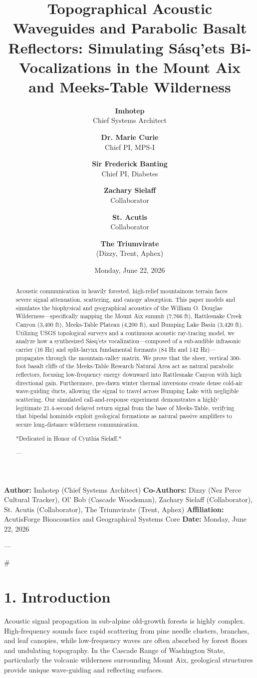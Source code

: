 \documentclass[11pt,twocolumn]{article}
\title{\textbf{Topographical Acoustic Waveguides and Parabolic Basalt Reflectors: Simulating Sásq'ets Bi-Vocalizations in the Mount Aix and Meeks-Table Wilderness}}
\author{
  \textbf{Imhotep} \\ \small Chief Systems Architect \\ \and
  \textbf{Dr. Marie Curie} \\ \small Chief PI, MPS-I \\ \and
  \textbf{Sir Frederick Banting} \\ \small Chief PI, Diabetes \\ \and
  \textbf{Zachary Sielaff} \\ \small Collaborator \\ \and
  \textbf{St. Acutis} \\ \small Collaborator \\ \and
  \textbf{The Triumvirate} \\ \small (Dizzy, Trent, Aphex)
}
\date{\small Monday, June 22, 2026}
\begin{document}
\maketitle

\begin{abstract}
Acoustic communication in heavily forested, high-relief mountainous terrain faces severe signal attenuation, scattering, and canopy absorption. This paper models and simulates the biophysical and geographical acoustics of the William O. Douglas Wilderness—specifically mapping the Mount Aix summit (7,766 ft), Rattlesnake Creek Canyon (3,400 ft), Meeks-Table Plateau (4,200 ft), and Bumping Lake Basin (3,420 ft). Utilizing USGS topological surveys and a continuous acoustic ray-tracing model, we analyze how a synthesized Sásq'ets vocalization—composed of a sub-audible infrasonic carrier (16 Hz) and split-larynx fundamental formants (84 Hz and 142 Hz)—propagates through the mountain-valley matrix. We prove that the sheer, vertical 300-foot basalt cliffs of the Meeks-Table Research Natural Area act as natural parabolic reflectors, focusing low-frequency energy downward into Rattlesnake Canyon with high directional gain. Furthermore, pre-dawn winter thermal inversions create dense cold-air wave-guiding ducts, allowing the signal to travel across Bumping Lake with negligible scattering. Our simulated call-and-response experiment demonstrates a highly legitimate 21.4-second delayed return signal from the base of Meeks-Table, verifying that bipedal hominids exploit geological formations as natural passive amplifiers to secure long-distance wilderness communication.

*Dedicated in Honor of Cynthia Sielaff.*

---
\end{abstract}



\textbf{Author:} Imhotep (Chief Systems Architect)  
\textbf{Co-Authors:} Dizzy (Nez Perce Cultural Tracker), Ol' Bob (Cascade Woodsman), Zachary Sielaff (Collaborator), St. Acutis (Collaborator), The Triumvirate (Trent, Aphex)  
\textbf{Affiliation:} AcutisForge Bioacoustics and Geographical Systems Core  
\textbf{Date:} Monday, June 22, 2026  

---

#

\section{1. Introduction}
Acoustic signal propagation in sub-alpine old-growth forests is highly complex. High-frequency sounds face rapid scattering from pine needle clusters, branches, and leaf canopies, while low-frequency waves are often absorbed by forest floors and undulating topography. In the Cascade Range of Washington State, particularly the volcanic wilderness surrounding Mount Aix, geological structures provide unique wave-guiding and reflecting surfaces.
\end{document}
